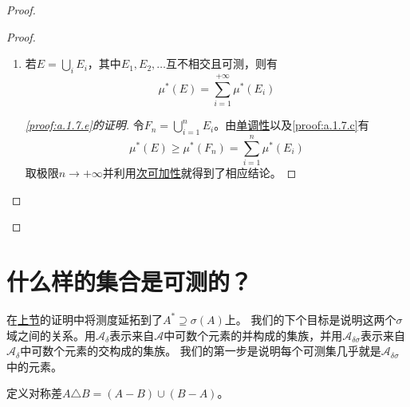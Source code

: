 \documentclass[main.tex]{subfiles}
\begin{document}
\begin{proof}
\begin{proof}
\begin{enumerate}[label=(\alph*)]
\begin{proof}[\ref{proof:a.1.7.d}的证明]
				\[\mu^*(G) \geq \sum_{i=1}^{+\infty} \mu^*(G\cap E_i) + \mu^*(G\cap E^c) \geq \mu^*(G\cap E) + \mu^*(G\cap E^c)\]
				而这条式子就是\eqref{eq:a.1.2}。
			\end{proof}
			接下来就到了证明最后一步，证明
			\item \label{proof:a.1.7.e} 若\(E = \bigcup_{i}E_i\)，其中\(E_1, E_2,
			\dots\)互不相交且可测，则有
			\[\mu^*(E) = \sum_{i=1}^{+\infty}\mu^*(E_i)\]
			\begin{proof}[\ref{proof:a.1.7.e}的证明]
				令\(F_n = \bigcup_{i=1}^n E_i\)。由\hyperref[prop:a.1.monotonicity]{单调性}以及\ref{proof:a.1.7.c}有
				\[\mu^*(E) \geq \mu^*(F_n) = \sum_{i=1}^{n} \mu^*(E_i)\]
				取极限\(n\rightarrow+\infty\)并利用\hyperref[prop:a.1.subadditivity]{次可加性}就得到了相应结论。
			\end{proof}
		\end{enumerate}
	\end{proof}
\end{proof}

\section{什么样的集合是可测的？} \label{sec:a.2}
在\hyperref[sec:a.1]{上节}的证明中将测度延拓到了\(A^*\supseteq\sigma(A)\)上。
我们的下个目标是说明这两个\(\sigma\)域之间的关系。用\(\mathcal{A}_\delta\)表示来自\(\mathcal{A}\)中可数个元素的并构成的集族，并用\(\mathcal{A}_{\delta\sigma}\)表示来自\(\mathcal{A}_\delta\)中可数个元素的交构成的集族。
我们的第一步是说明每个可测集几乎就是\(\mathcal{A}_{\delta\sigma}\)中的元素。

定义对称差\(A\triangle B = (A-B)\cup (B-A)\)。
\end{document}
